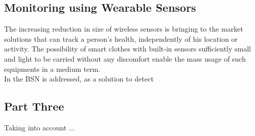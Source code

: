 \subsection{Monitoring using Wearable Sensors}
\label{ssec:part2}
The increasing reduction in size of wireless sensors is bringing to the market solutions that can track a person's health, independently of his location or activity. The possibility of smart clothes with built-in sensors sufficiently small and light to be carried without any discomfort enable the mass usage of such equipments in a medium term.\\
In \cite{8} the \acf{BSN} is addressed, as a solution to detect  


\subsection{Part Three}
\label{sec:part3}
Taking into account ...

\cite{1}